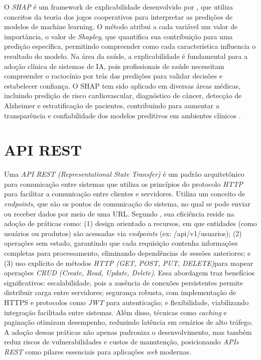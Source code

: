 \documentclass[12pt, a4paper]{report}
\theoremstyle{definition}
\theoremstyle{remark}
\theoremstyle{plain}
\begin{document}
O \textit{SHAP} é um framework de explicabilidade desenvolvido por \textcite{Lundberg2017}, que utiliza conceitos da teoria dos jogos cooperativos para interpretar as predições de modelos de machine learning. O método atribui a cada variável um valor de importância, o valor de \textit{Shapley}, que quantifica sua contribuição para uma predição específica, permitindo compreender como cada característica influencia o resultado do modelo. Na área da saúde, a explicabilidade é fundamental para a adoção clínica de sistemas de IA, pois profissionais de saúde necessitam compreender o raciocínio por trás das predições para validar decisões e estabelecer confiança. O SHAP tem sido aplicado em diversas áreas médicas, incluindo predição de risco cardiovascular, diagnóstico de câncer, detecção de Alzheimer e estratificação de pacientes, contribuindo para aumentar a transparência e confiabilidade dos modelos preditivos em ambientes clínicos \cite{Islam2024}.

\section{API REST}

Uma \textit{API REST (Representational State Transfer)} é um padrão arquitetônico para comunicação entre sistemas que utiliza os princípios do protocolo \textit{HTTP} para facilitar a comunicação entre clientes e servidores. Utiliza um conceito de \textit{endpoints}, que são os pontos de comunicação do sistema, no qual se pode enviar ou receber dados por meio de uma URL. Segundo \cite{gowda2024}, sua eficiência reside na adoção de práticas como: (1) design orientado a recursos, em que entidades (como usuários ou produtos) são acessadas via \textit{endpoints} (ex: /api/v1/usuarios); (2) operações sem estado, garantindo que cada requisição contenha informações completas para processamento, eliminando dependências de sessões anteriores; e (3) uso explícito de métodos \textit{HTTP (GET, POST, PUT, DELETE)}para mapear operações \textit{CRUD (Create, Read, Update, Delete)}. Essa abordagem traz benefícios significativos: escalabilidade, pois a ausência de conexões persistentes permite distribuir carga entre servidores; segurança robusta, com implementação de HTTPS e protocolos como \textit{JWT} para autenticação; e flexibilidade, viabilizando integração facilitada entre sistemas. Além disso, técnicas como \textit{caching} e paginação otimizam desempenho, reduzindo latência em cenários de alto tráfego\cite{gowda2024}. A adoção dessas práticas não apenas padroniza o desenvolvimento, mas também reduz riscos de vulnerabilidades e custos de manutenção, posicionando \textit{APIs REST} como pilares essenciais para aplicações \textit{web} modernas.
\end{document}
